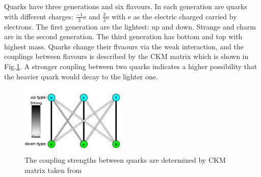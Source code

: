 \\
\\Quarks have three generations and six flavours. In each generation are quarks with different charges: $\frac{-1}{3}$e and $\frac{2}{3}$e with e as the electric charged carried by electrons. The first generation are the lightest: up and down. Strange and charm are in the second generation. The third generation has bottom and top with highest mass. Quarks change their flvaours via the weak interaction, and the couplings between flavours is described by the CKM matrix which is shown in Fig.\ref{Fig:quarks}. A stronger coupling between two quarks indicates a higher possibility that the heavier quark would decay to the lighter one. 
\\    
\begin{figure}[!h]                
	\includegraphics[width=0.45\textwidth]{Chapter1/quarks.png}
	\centering
	\begin{center}
		\caption{The coupling strengths between quarks are determined by CKM matrix taken from \cite{ckm_timothy}}
		\label{Fig:quarks}            
	\end{center}
\end{figure}

